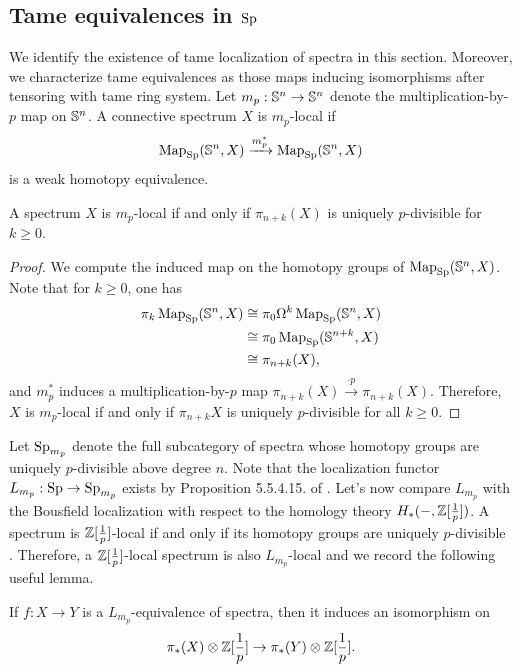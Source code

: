 \subsection{Tame equivalences in $\operatorname{Sp}$}
We identify the existence of tame localization of spectra in this section. Moreover, we characterize tame equivalences as those maps inducing isomorphisms after tensoring with tame ring system.
Let $m_p:{\mathbb{S}}^n\to {\mathbb{S}}^n$ denote the multiplication-by-$p$ map on ${\mathbb{S}}^n$. A connective spectrum $X$ is $m_p$-local if 
\[
\operatorname{Map}_{\operatorname{Sp}}({\mathbb{S}}^n,X) \xrightarrow{m_p^*} \operatorname{Map}_{\operatorname{Sp}}({\mathbb{S}}^n,X)
\]
is a weak homotopy equivalence.
\begin{lemma}
\label{local w.r.t. multiplication-by-p map}
	A spectrum $X$ is $m_p$-local if and only if $\pi_{n+k}(X)$ is uniquely $p$-divisible for $k\geq 0$.
\end{lemma}
\begin{proof}
	We compute the induced map on the homotopy groups of $\operatorname{Map}_{\operatorname{Sp}}({\mathbb{S}}^n,X)$. Note that for $k\geq 0$, one has
	\begin{align*}
		\pi_k\operatorname{Map}_{\operatorname{Sp}}({\mathbb{S}}^n,X) & \cong \pi_0 \Omega^k\operatorname{Map}_{\operatorname{Sp}}({\mathbb{S}}^n,X)\\
		     					 & \cong \pi_0 \operatorname{Map}_{\operatorname{Sp}}({\mathbb{S}}^{n+k},X)\\
		     					 & \cong \pi_{n+k} (X),
	\end{align*}
	and $m_p^*$ induces a multiplication-by-$p$ map $ \pi_{n+k} (X) \xrightarrow{\cdot p} \pi_{n+k} (X)$. Therefore, $X$ is $m_p$-local if and only if $\pi_{n+k}X$ is uniquely $p$-divisible for all $k\geq 0$.
\end{proof}
Let $\operatorname{Sp}_{m_p}$ denote the full subcategory of spectra whose homotopy groups are uniquely $p$-divisible above degree $n$.
Note that the localization functor $L_{m_p}:\operatorname{Sp} \to \operatorname{Sp}_{m_p}$ exists by Proposition 5.5.4.15. of \cite{HTT}.
Let's now compare $L_{m_p}$ with the Bousfield localization with respect to the homology theory $H_{*}(-,{\mathbb{Z}}[\frac{1}{p}])$. A spectrum is ${\mathbb{Z}}[\frac{1}{p}]$-local if and only if its homotopy groups are uniquely $p$-divisible \cite[Proposition 2.4]{BousfieldSpectra}. Therefore, a ${\mathbb{Z}}[\frac{1}{p}]$-local spectrum is also $L_{m_p}$-local and we record the following useful lemma.
\begin{lemma}
\label{L-equivalence implies Z[1/p]-iso}
	If $f:X\to Y$ is a $L_{m_{p}}$-equivalence of spectra, then it induces an isomorphism on 
	$$
	\pi_{*}(X)\otimes {\mathbb{Z}}[\frac{1}{p}]
	\to
	\pi_{*}(Y)\otimes {\mathbb{Z}}[\frac{1}{p}].
	$$
\end{lemma}

